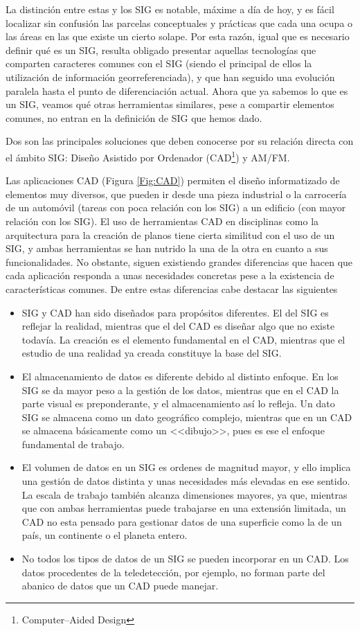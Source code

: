 La distinción entre estas y los SIG es notable, máxime a día de hoy, y es fácil localizar sin confusión las parcelas conceptuales y prácticas que cada una ocupa o las áreas en las que existe un cierto solape. Por esta razón, igual que es necesario definir qué es un SIG, resulta obligado presentar aquellas tecnologías que comparten caracteres comunes con el SIG (siendo el principal de ellos la utilización de información georreferenciada), y que han seguido una evolución paralela hasta el punto de diferenciación actual. Ahora que ya sabemos lo que es un SIG, veamos qué otras herramientas similares, pese a compartir elementos comunes, no entran en la definición de SIG que hemos dado.

Dos son las principales soluciones que deben conocerse por su relación directa con el ámbito SIG: Diseño Asistido por Ordenador (CAD\footnote{Computer--Aided Design}) y AM/FM.

Las aplicaciones CAD (Figura \ref{Fig:CAD}) permiten el diseño informatizado de elementos muy diversos, que pueden ir desde una pieza industrial o la carrocería de un automóvil (tareas con poca relación con los SIG) a un edificio (con mayor relación con los SIG). El uso de herramientas CAD en disciplinas como la arquitectura para la creación de planos tiene cierta similitud con el uso de un SIG, y ambas herramientas se han nutrido la una de la otra en cuanto a sus funcionalidades. No obstante, siguen existiendo grandes diferencias que hacen que cada aplicación responda a unas necesidades concretas pese a la existencia de características comunes. De entre estas diferencias cabe destacar las siguientes \cite{ESRI2002GISCAD}\cite{Baguena1995Mapping}

\begin{itemize}
\item SIG y CAD han sido diseñados para propósitos diferentes. El del SIG es reflejar la realidad, mientras que el del CAD es diseñar algo que no existe todavía. La creación es el elemento fundamental en el CAD, mientras que el estudio de una realidad ya creada constituye la base del SIG.
\item El almacenamiento de datos es diferente debido al distinto enfoque. En los SIG se da mayor peso a la gestión de los datos, mientras que en el CAD la parte visual es preponderante, y el almacenamiento así lo refleja. Un dato SIG se almacena como un dato geográfico complejo, mientras que en un CAD se almacena básicamente como un <<dibujo>>, pues es ese el enfoque fundamental de trabajo.
\item El volumen de datos en un SIG es ordenes de magnitud mayor, y ello implica una gestión de datos distinta y unas necesidades más elevadas en ese sentido. La escala de trabajo también alcanza dimensiones mayores, ya que, mientras que con ambas herramientas puede trabajarse en una extensión limitada, un CAD no esta pensado para gestionar datos de una superficie como la de un país, un continente o el planeta entero.
\item No todos los tipos de datos de un SIG se pueden incorporar en un CAD. Los datos procedentes de la teledetección, por ejemplo, no forman parte del abanico de datos que un CAD puede manejar.
\end{itemize}


